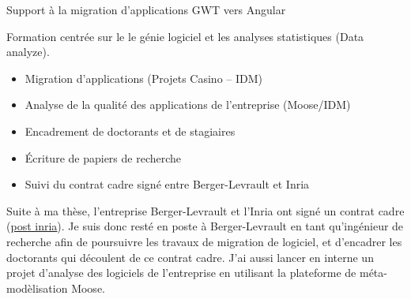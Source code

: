 \documentclass[10pt,a4paper,ragged2e,withhyper]{altacv}
\begin{document}
\begin{paracol}{2}





Support à la migration d'applications GWT vers Angular


\divider

Formation centrée sur le le génie logiciel et les analyses statistiques (Data analyze).


\divider




\divider




\end{paracol}

\newpage



\begin{itemize}
  \item Migration d'applications (Projets Casino -- IDM)
  \item Analyse de la qualité des applications de l'entreprise (Moose/IDM)
  \item Encadrement de doctorants et de stagiaires
  \item Écriture de papiers de recherche
  \item Suivi du contrat cadre signé entre Berger-Levrault et Inria
\end{itemize}

Suite à ma thèse, l'entreprise Berger-Levrault et l'Inria ont signé un contrat cadre (\href{https://www.inria.fr/fr/berger-levrault-inria-partenariat-numerique-responsable}{\color{blue}\underline{post inria}}).
Je suis donc resté en poste à Berger-Levrault en tant qu'ingénieur de recherche afin de poursuivre les travaux de migration de logiciel, et d'encadrer les doctorants qui découlent de ce contrat cadre.
J'ai aussi lancer en interne un projet d'analyse des logiciels de l'entreprise en utilisant la plateforme de méta-modèlisation Moose.
\end{document}
